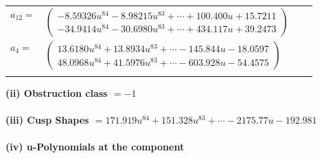 \documentclass[1p]{elsarticle_modified}
\theoremstyle{definition}
\begin{document}
\begin{tabular}{m{7pt} m{180pt} m{7pt} m{180pt} }
\flushright $a_{12}=$&$\begin{pmatrix}-8.59326 u^{84}-8.98215 u^{83}+\cdots+100.400 u+15.7211\\-34.9414 u^{84}-30.6980 u^{83}+\cdots+434.117 u+39.2473\end{pmatrix}$ \\
\flushright $a_{4}=$&$\begin{pmatrix}13.6180 u^{84}+13.8934 u^{83}+\cdots-145.844 u-18.0597\\48.0968 u^{84}+41.5976 u^{83}+\cdots-603.928 u-54.4575\end{pmatrix}$\\&\end{tabular}
\flushleft \textbf{(ii) Obstruction class $= -1$}\\~\\
\flushleft \textbf{(iii) Cusp Shapes $= 171.919 u^{84}+151.328 u^{83}+\cdots-2175.77 u-192.981$}\\~\\
\newpage\renewcommand{\arraystretch}{1}
\flushleft \textbf{(iv) u-Polynomials at the component}\newline \\
\end{document}
